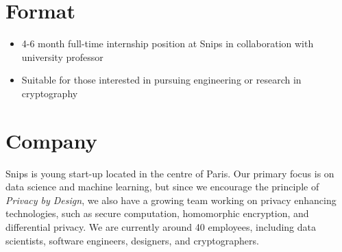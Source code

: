 \documentclass{article}
\begin{document}
\section*{Format}
\begin{itemize}
\item 4-6 month full-time internship position at Snips in collaboration with university professor
\item Suitable for those interested in pursuing engineering or research in cryptography
\end{itemize}

\section*{Company}
Snips is young start-up located in the centre of Paris. Our primary focus is on data science and machine learning, but since we encourage the principle of \emph{Privacy by Design}, we also have a growing team working on privacy enhancing technologies, such as secure computation, homomorphic encryption, and differential privacy. We are currently around 40 employees, including data scientists, software engineers, designers, and cryptographers.
\end{document}
